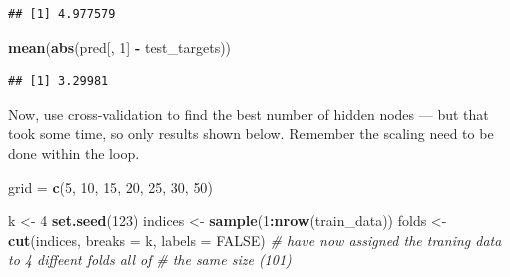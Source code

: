 \documentclass[10pt,ignorenonframetext,]{beamer}
\newenvironment{Shaded}{\begin{snugshade}}{\end{snugshade}}
\newcommand{\KeywordTok}[1]{\textcolor[rgb]{0.13,0.29,0.53}{\textbf{#1}}}
\newcommand{\DataTypeTok}[1]{\textcolor[rgb]{0.13,0.29,0.53}{#1}}
\newcommand{\DecValTok}[1]{\textcolor[rgb]{0.00,0.00,0.81}{#1}}
\newcommand{\StringTok}[1]{\textcolor[rgb]{0.31,0.60,0.02}{#1}}
\newcommand{\CommentTok}[1]{\textcolor[rgb]{0.56,0.35,0.01}{\textit{#1}}}
\newcommand{\OtherTok}[1]{\textcolor[rgb]{0.56,0.35,0.01}{#1}}
\newcommand{\OperatorTok}[1]{\textcolor[rgb]{0.81,0.36,0.00}{\textbf{#1}}}
\newcommand{\NormalTok}[1]{#1}
\begin{document}
\begin{frame}[fragile]
\begin{verbatim}
## [1] 4.977579
\end{verbatim}

\begin{Shaded}
\begin{Highlighting}[]
\KeywordTok{mean}\NormalTok{(}\KeywordTok{abs}\NormalTok{(pred[, }\DecValTok{1}\NormalTok{] }\OperatorTok{-}\StringTok{ }\NormalTok{test_targets))}
\end{Highlighting}
\end{Shaded}

\begin{verbatim}
## [1] 3.29981
\end{verbatim}

\end{frame}

\begin{frame}[fragile]

Now, use cross-validation to find the best number of hidden nodes ---
but that took some time, so only results shown below. Remember the
scaling need to be done within the loop.

\begin{Shaded}
\begin{Highlighting}[]
\NormalTok{grid =}\StringTok{ }\KeywordTok{c}\NormalTok{(}\DecValTok{5}\NormalTok{, }\DecValTok{10}\NormalTok{, }\DecValTok{15}\NormalTok{, }\DecValTok{20}\NormalTok{, }\DecValTok{25}\NormalTok{, }\DecValTok{30}\NormalTok{, }\DecValTok{50}\NormalTok{)}

\NormalTok{k <-}\StringTok{ }\DecValTok{4}
\KeywordTok{set.seed}\NormalTok{(}\DecValTok{123}\NormalTok{)}
\NormalTok{indices <-}\StringTok{ }\KeywordTok{sample}\NormalTok{(}\DecValTok{1}\OperatorTok{:}\KeywordTok{nrow}\NormalTok{(train_data))}
\NormalTok{folds <-}\StringTok{ }\KeywordTok{cut}\NormalTok{(indices, }\DataTypeTok{breaks =}\NormalTok{ k, }\DataTypeTok{labels =} \OtherTok{FALSE}\NormalTok{)}
\CommentTok{# have now assigned the traning data to 4 diffeent folds all of}
\CommentTok{# the same size (101)}


\end{Highlighting}
\end{Shaded}
\end{frame}
\end{document}
